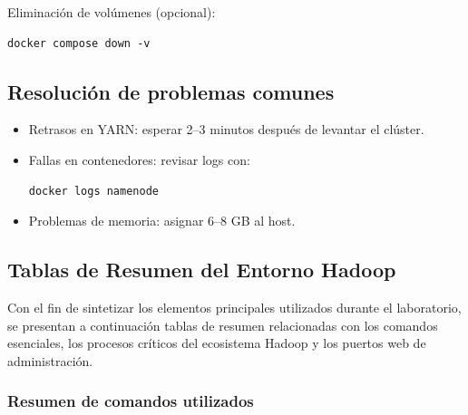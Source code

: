 Eliminación de volúmenes (opcional):

\begin{verbatim}
docker compose down -v
\end{verbatim}

\subsection{Resolución de problemas comunes}

\begin{itemize}
    \item Retrasos en YARN: esperar 2--3 minutos después de levantar el clúster.
    \item Fallas en contenedores: revisar logs con:
\begin{verbatim}
docker logs namenode
\end{verbatim}
    \item Problemas de memoria: asignar 6--8 GB al host.
\end{itemize}

\subsection{Tablas de Resumen del Entorno Hadoop}

Con el fin de sintetizar los elementos principales utilizados durante el laboratorio, se presentan a continuación tablas de resumen relacionadas con los comandos esenciales, los procesos críticos del ecosistema Hadoop y los puertos web de administración.

\subsubsection*{Resumen de comandos utilizados}

